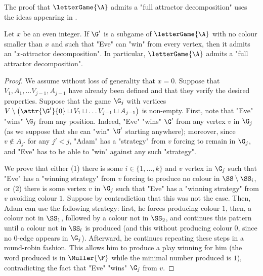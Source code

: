 \documentclass{theoretics}
\begin{document}
The proof that $\letterGame{\A}$ admits a "full attractor decomposition" uses the ideas appearing in \cite[Section~3]{DJW1997memory}.
\begin{lemma}
	Let $x$ be an even integer. If $\G'$ is a subgame of $\letterGame{\A}$  with no colour smaller than $x$ and such that "Eve" can "win" from every vertex, then it admits an "$x$-attractor decomposition".
	In particular, $\letterGame{\A}$ admits a "full attractor decomposition".
\end{lemma}
\begin{proof}
	We assume without loss of generality that $x=0$.
	Suppose that $V_1, A_1,\dots V_{j-1}, A_{j-1}$ have already been defined and that they verify the desired properties. Suppose that the game $\G_j$ with vertices $V\setminus \left(\attr{\G'}{0} \sqcup V_1 \sqcup \dots  V_{j-1} \sqcup A_{j-1}\right)$ is non-empty. First, note that "Eve" "wins" $\G_j$ from any position. Indeed, "Eve" "wins" $\G'$ from any vertex $v$ in $\G_j$ (as we suppose that she can "win"~$\G'$ starting anywhere); moreover, since $v\notin A_{j'}$ for any $j'<j$, "Adam" has a "strategy" from $v$ forcing to remain in $\G_j$, and "Eve" has to be able to "win" against any such "strategy".
	
	We prove that either (1) there is some $i\in \{1,\dots, k\}$ and $v$ vertex in $\G_j$ such that "Eve" has a "winning strategy" from $v$ forcing to produce no colour in $\SS\setminus \SS_i$, or (2) there is some vertex $v$ in $\G_j$  such that "Eve" has a "winning strategy" from $v$ avoiding colour $1$. Suppose by contradiction that this was not the case. Then, Adam can use the following strategy: first, he forces producing colour $1$, then, a colour not in $\SS_1$, followed by a colour not in $\SS_2$, and continues this pattern until a colour not in $\SS_l$ is produced (and this without producing colour $0$, since no $0$-edge appears in $\G_j$). Afterward, he continues repeating these steps in a round-robin fashion. This allows him to produce a play winning for him (the word produced is in $\Muller{\F}$ while the minimal number produced is $1$), contradicting the fact that "Eve" "wins" $\G_j$ from $v$.
	

\end{proof}
\end{document}
